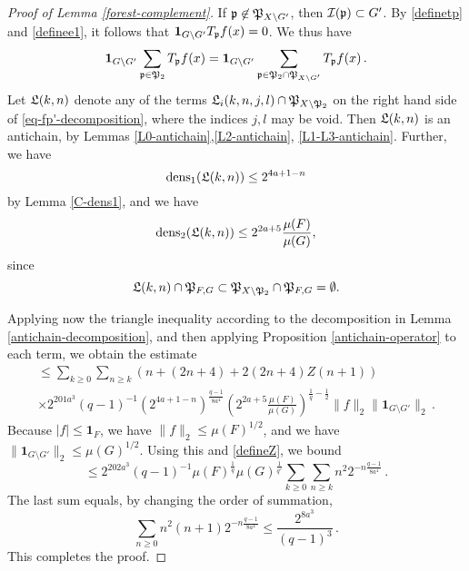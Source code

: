 {\begin{proof}[Proof of Lemma \ref{forest-complement}]
    If ${\mathfrak p} \not\in {\mathfrak P}_{X \setminus G'}$, then ${\mathcal{I}}({\mathfrak p}) \subset G'$. By \eqref{definetp} and \eqref{definee1}, it follows that
    $\mathbf{1}_{G \setminus G'} T_{{\mathfrak p}}f(x) = 0$. We thus have
    $$
        \mathbf{1}_{G\setminus G'} \sum_{{\mathfrak p} \in {\mathfrak P}_2} T_{{\mathfrak p}}f(x) = \mathbf{1}_{G\setminus G'} \sum_{{\mathfrak p} \in {\mathfrak P}_2 \cap {\mathfrak P}_{X \setminus G'}} T_{{\mathfrak p}}f(x)\,.
    $$
    Let ${\mathfrak L}(k,n)$ denote any of the terms ${\mathfrak L}_i(k,n,j,l) \cap {\mathfrak P}_{X \setminus {\mathfrak P}_2}$ on the right hand side of \eqref{eq-fp'-decomposition}, where the indices $j, l$ may be void. Then ${\mathfrak L}(k,n)$ is an antichain, by Lemmas \ref{L0-antichain},\ref{L2-antichain}, \ref{L1-L3-antichain}. Further, we have
    \begin{equation*}
    \operatorname{\operatorname{dens}}_1({\mathfrak L}(k,n)) \le 2^{4a+1 - n}
    \end{equation*}
    by Lemma \ref{C-dens1}, and we have
    \begin{equation*}
     \operatorname{\operatorname{dens}}_2({\mathfrak L}(k,n)) \le 2^{2a+5} \frac{\mu(F)}{\mu(G)},
     \end{equation*}
     since
     \begin{equation*}
     {\mathfrak L}(k,n) \cap {\mathfrak P}_{F,G} \subset {\mathfrak P}_{X \setminus {\mathfrak P}_2} \cap {\mathfrak P}_{F, G} = \emptyset.
     \end{equation*}

    Applying now the triangle inequality according to the decomposition in Lemma \ref{antichain-decomposition}, and then applying Proposition \ref{antichain-operator} to each term, we obtain the estimate
    \begin{multline*}
        \le \sum_{k \ge 0} \sum_{n \ge k} (n + (2n+4) + 2(2n+4) Z(n+1)) \\
        \times 2^{201a^3}(q-1)^{-1} (2^{4a+1-n})^{\frac{q-1}{8a^4}} (2^{2a+5} \frac{\mu(F)}{\mu(G)})^{\frac{1}{q} - \frac{1}{2}} \|f\|_2\|\mathbf{1}_{G\setminus G'}\|_2\,.
    \end{multline*}
    Because $|f| \le \mathbf{1}_F$, we have $\|f\|_2 \le \mu(F)^{1/2}$, and we have $\|\mathbf{1}_{G\setminus G'}\|_2 \le \mu(G)^{1/2}$. Using this and \eqref{defineZ}, we bound
    $$
        \le 2^{202a^3} (q - 1)^{-1} \mu(F)^{\frac{1}{q}} \mu(G)^{\frac{1}{q'}}  \sum_{k \ge 0} \sum_{n \ge k} n^2 2^{-n\frac{q-1}{8a^4}}\,.
    $$
    The last sum equals, by changing the order of summation,
    $$
        \sum_{n \ge 0} n^2(n+1) 2^{-n\frac{q-1}{8a^4}} \le \frac{2^{8a^3}}{(q-1)^3}\,.
    $$
    This completes the proof.
\end{proof}

}
